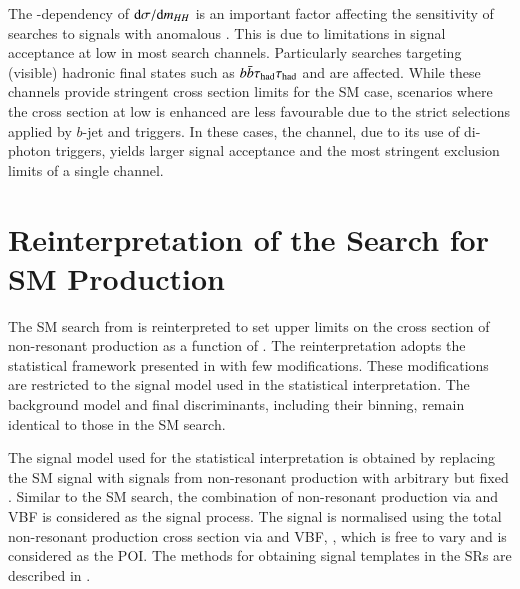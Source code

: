 The \klambda-dependency of $\mathrm{d}\sigma / \mathrm{d}m_{HH}$ is an important
factor affecting the sensitivity of searches to signals with anomalous
\klambda. This is due to limitations in signal acceptance at low \mHH in most
search channels.
Particularly searches targeting (visible) hadronic final states such as
$b\bar{b}\tau_{\text{had}}\tau_{\text{had}}$ and \bbbb are affected. While these channels provide stringent
cross section limits for the SM case, scenarios where the cross section at low
\mHH is enhanced are less favourable due to the strict selections applied by
$b$-jet and \tauhadvis triggers. In these cases, the \bbyy channel, due to its
use of di-photon triggers, yields larger signal acceptance and the most
stringent exclusion limits of a single channel.


\section{Reinterpretation of the Search for SM \HH Production}%
\label{sec:reinterpretation}

The SM \HH search from  is reinterpreted to set
upper limits on the cross section of non-resonant \HH production as a
function of \klambda. %
The reinterpretation adopts the statistical framework presented in
 with few modifications. These
modifications are restricted to the signal model used in the
statistical interpretation. The background model and final
discriminants, including their binning, remain identical to those in
the SM \HH search.

The signal model used for the statistical interpretation is obtained by
replacing the SM \HH signal with signals from non-resonant \HH production with
arbitrary but fixed \klambda. Similar to the SM \HH search, the combination of
non-resonant \HH production via \ggF and VBF is considered as the signal
process. The signal is normalised using the total non-resonant \HH production
cross section via \ggF and VBF, \xsecggfvbf, which is free to vary and is
considered as the POI.
The methods for obtaining signal templates in the SRs are described in
.


